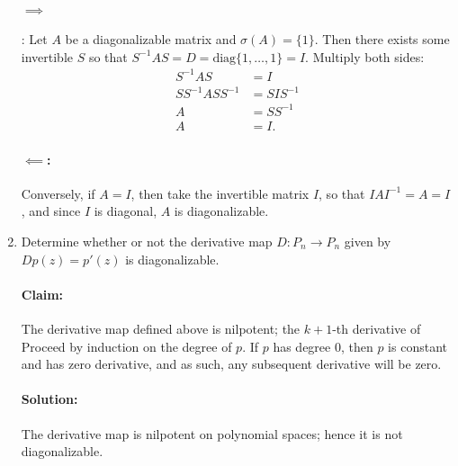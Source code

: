 \documentclass{article}
\begin{document}
\begin{enumerate}
    \paragraph{$\implies$}: Let $A$ be a diagonalizable matrix and $\sigma(A)=\{1\} $. Then there exists some invertible $S$ so that $S^{-1}AS=D=\text{diag}\{1,\ldots,1\}=I$. Multiply both sides:
    \begin{align*}
        S^{-1}AS&= I \\
        SS^{-1}ASS^{-1}&=SIS^{-1}\\
        A&=SS^{-1}\\
        A&= I
    .\end{align*}

    \paragraph{$\impliedby$:} Conversely, if $A=I$, then take the invertible matrix $I$, so that $IAI^{-1}=A=I$, and since $I$ is diagonal, $A$ is diagonalizable. 

\item Determine whether or not the derivative map $D : P_n \rightarrow P_n$ given by $Dp(z) = p'(z)$ is diagonalizable.
    \paragraph{Claim: }The derivative map defined above is nilpotent; the $k+1$-th derivative of 
  Proceed by induction on the degree of $p$. If $p$ has degree $0$, then $p$ is constant and has zero derivative, and as such, any subsequent derivative will be zero.

  \paragraph{Solution: } The derivative map is nilpotent on polynomial spaces; hence it is not diagonalizable.

\end{enumerate}
\end{document}
